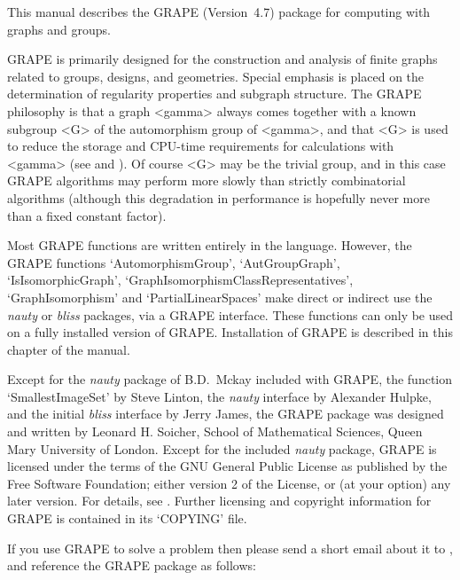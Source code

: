 %
%
%
%
\def\GRAPE{\sf GRAPE}
\def\nauty{\it nauty}
\def\bliss{\it bliss}
\def\Aut{{\rm Aut}\,} 


This manual describes the {\GRAPE} (Version~4.7) package for computing
with graphs and groups.

{\GRAPE} is primarily designed for the construction and analysis of
finite graphs related to groups, designs, and geometries. Special
emphasis is placed on the determination of regularity properties and
subgraph structure. The {\GRAPE} philosophy is that a graph <gamma>
always comes together with a known subgroup <G> of the automorphism
group of <gamma>, and that <G> is used to reduce the storage and
CPU-time requirements for calculations with <gamma> (see
\cite{Soi93} and \cite{Soi04}).  Of course <G> may be the trivial group,
and in this case {\GRAPE} algorithms may perform more slowly than strictly
combinatorial algorithms (although this degradation in performance is
hopefully never more than a fixed constant factor).

Most {\GRAPE} functions are written entirely in the {\GAP} language.
However, the {\GRAPE} functions `AutomorphismGroup', `AutGroupGraph',
`IsIsomorphicGraph', `GraphIsomorphismClassRepresentatives',
`GraphIsomorphism'  and `PartialLinearSpaces' make direct or indirect
use the {\nauty} \cite{Nau90,MP14} or {\bliss} \cite{JK07} packages,
via a {\GRAPE} interface.  These functions can only be used on a fully
installed version of {\GRAPE}. Installation of {\GRAPE} is described in
this chapter of the manual.

Except for the {\nauty} package of B.D.~Mckay included with {\GRAPE},
the function `SmallestImageSet' by Steve Linton, the {\nauty} interface
by Alexander Hulpke, and the initial {\bliss} interface by Jerry James,
the {\GRAPE} package was designed and written by Leonard H. Soicher,
School of Mathematical Sciences, Queen Mary University of London.
Except for the included {\nauty} package, {\GRAPE} is licensed under the
terms of the GNU General Public License as published by the Free Software
Foundation; either version 2 of the License, or (at your option) any later
version. For details, see .
Further licensing and copyright information for {\GRAPE} is contained
in its `COPYING' file.

If you use {\GRAPE} to solve a problem then please send a short email
about it to , and reference the {\GRAPE} 
package as follows:

